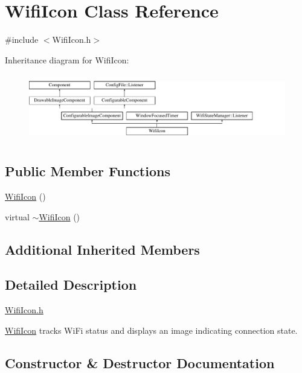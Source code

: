 \hypertarget{classWifiIcon}{}\section{Wifi\+Icon Class Reference}
\label{classWifiIcon}


{\ttfamily \#include $<$Wifi\+Icon.\+h$>$}

Inheritance diagram for Wifi\+Icon\+:\begin{figure}[H]
\begin{center}
\leavevmode
\includegraphics[height=2.962963cm]{classWifiIcon}
\end{center}
\end{figure}
\subsection*{Public Member Functions}
\begin{DoxyCompactItemize}
\item 
\mbox{\hyperlink{classWifiIcon_adbd42431795151aae500d7cb45facca7}{Wifi\+Icon}} ()
\item 
virtual \mbox{\hyperlink{classWifiIcon_add720487297e455d528ed26ea8c53609}{$\sim$\+Wifi\+Icon}} ()
\end{DoxyCompactItemize}
\subsection*{Additional Inherited Members}


\subsection{Detailed Description}
\mbox{\hyperlink{WifiIcon_8h}{Wifi\+Icon.\+h}}

\mbox{\hyperlink{classWifiIcon}{Wifi\+Icon}} tracks Wi\+Fi status and displays an image indicating connection state. 

\subsection{Constructor \& Destructor Documentation}
\mbox{\label{classWifiIcon_adbd42431795151aae500d7cb45facca7}} 
